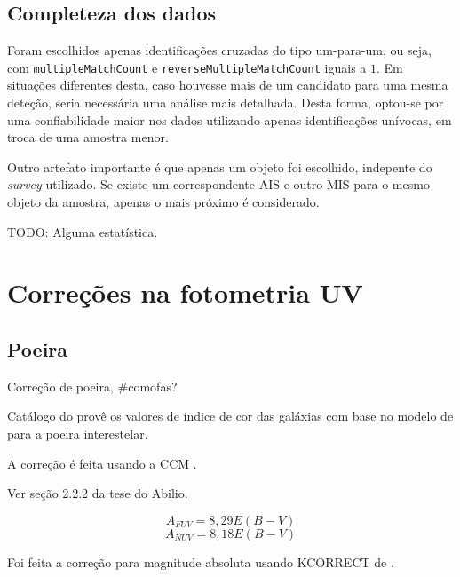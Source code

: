 \subsection{Completeza dos dados}

Foram escolhidos apenas identificações cruzadas do tipo um-para-um, ou seja, com
{\tt multipleMatchCount} e {\tt reverseMultipleMatchCount} iguais a $1$. Em
situações diferentes desta, caso houvesse mais de um candidato para uma mesma
deteção, seria necessária uma análise mais detalhada. Desta forma, optou-se por
uma confiabilidade maior nos dados utilizando apenas identificações unívocas, em
troca de uma amostra menor.

Outro artefato importante é que apenas um objeto foi escolhido, indepente do
{\em survey} \galex utilizado. Se existe um correspondente AIS e outro MIS para
o mesmo objeto da amostra, apenas o mais próximo é considerado.\fixme

TODO: Alguma estatística.


\section{Correções na fotometria UV}
\label{sec:Crossmatch:Correcoes}

\subsection{Poeira}
\label{sec:Crossmatch:Correcoes:Poeira}

Correção de poeira, \#comofas?

Catálogo do \galex provê os valores de índice de cor das galáxias com base no
modelo de \citet{Schlegel1998} para a poeira interestelar.

A correção é feita usando a CCM \citep{Cardelli1989}.

Ver seção 2.2.2 da tese do Abilio.

$$
	A_{FUV} = 8,29 E(B-V)
$$
$$
	A_{NUV} = 8,18 E(B-V)
$$

Foi feita a correção para magnitude absoluta usando KCORRECT de
\citet{Blanton2007}.


